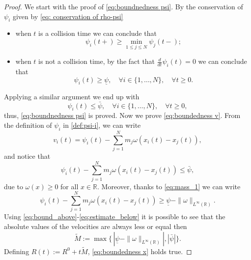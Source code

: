 \documentclass[11pt,a4paper,oneside]{amsart}
\newcommand\R{\mathbb{R}}
\begin{document}
\begin{proof}
    We start with the proof of \eqref{eq:boundnedness psi}. By the conservation of  $\psi_i$ 
    given by \eqref{eq: conservation of rho-psi}
    \begin{itemize}
    	\item  when $t$ is a collision time we can conclude that
    \begin{equation*}
        \psi_i(t+)\geq\min_{1\leq j\leq N} \psi_j(t-);
    \end{equation*}
    \item when $t$ is not a collision time, by the fact that $\frac{d}{dt}\psi_i(t)=0$ we can conclude that
    \begin{equation*}
        \psi_i(t)\geq\underline\psi,\quad\forall i\in\{1,\dots,N\},\quad\forall t\geq0.
    \end{equation*}
    \end{itemize}
   Applying a similar argument we end up with 
    \begin{equation*}
        \psi_i(t)\leq\bar\psi,\quad\forall i\in\{1,\dots,N\},\quad\forall t\geq0,
    \end{equation*}
    thus, \eqref{eq:boundnedness psi} is proved.\newline
    Now we prove \eqref{eq:boundedness v}. 
    From the definition of $\psi_i$ in \eqref{def:psi-i}, we can write
    $$
    v_i(t)=\psi_i(t)-\sum_{j=1}^Nm_j\omega(x_i(t)-x_j(t)),
    $$
    and notice that
    \begin{equation}\label{eq:bound_above}
    \psi_i(t)-\sum_{j=1}^Nm_j\omega(x_i(t)-x_j(t))\leq\bar\psi,
    \end{equation}
    due to $\omega(x)\geq0$ for all $x\in\R$.
    Moreover, thanks to \eqref{eq:mass_1} we can write 
    \begin{equation}\label{eq:estimate_below}
    \psi_i(t)-\sum_{j=1}^Nm_j\omega(x_i(t)-x_j(t))\geq \underline\psi-\|\omega\|_{L^\infty(\R)}.
    \end{equation}
    Using \eqref{eq:bound_above}-\eqref{eq:estimate_below} it is possible to see that the absolute values of the velocities are always less or equal then 
    \begin{equation*}
        \tilde M:=\max\{\,|\underline\psi-\|\omega\|_{L^\infty(\R)}|,|\bar\psi|\}.
    \end{equation*}
    Defining $R(t):=R^0+t\tilde M$, \eqref{eq:boundedness x} holds true.
\end{proof}
\end{document}
